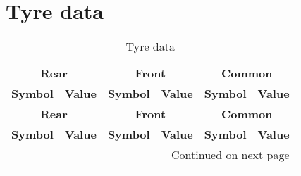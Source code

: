 \section{Tyre data}
\label{app:TyreData}
%
\begin{longtable}{cccccc}
    \caption{Tyre data} \label{tab:TyreData} \\
    \hline \multicolumn{2}{c}{\textbf{Rear}} & \multicolumn{2}{c}{\textbf{Front}} & \multicolumn{2}{c}{\textbf{Common}}\\
    \multicolumn{1}{c}{\textbf{Symbol}} & \multicolumn{1}{c}{\textbf{Value}} & \multicolumn{1}{c}{\textbf{Symbol}} & \multicolumn{1}{c}{\textbf{Value}} & \multicolumn{1}{c}{\textbf{Symbol}} & \multicolumn{1}{c}{\textbf{Value}} \\ \hline
    \endfirsthead

    \hline \multicolumn{2}{c}{\textbf{Rear}} & \multicolumn{2}{c}{\textbf{Front}} & \multicolumn{2}{c}{\textbf{Common}}\\
    \multicolumn{1}{c}{\textbf{Symbol}} & \multicolumn{1}{c}{\textbf{Value}} & \multicolumn{1}{c}{\textbf{Symbol}} & \multicolumn{1}{c}{\textbf{Value}} & \multicolumn{1}{c}{\textbf{Symbol}} & \multicolumn{1}{c}{\textbf{Value}} \\ \hline
    \endhead

    \hline \multicolumn{6}{r}{{Continued on next page}} \\ \hline
    \endfoot


\end{longtable}
